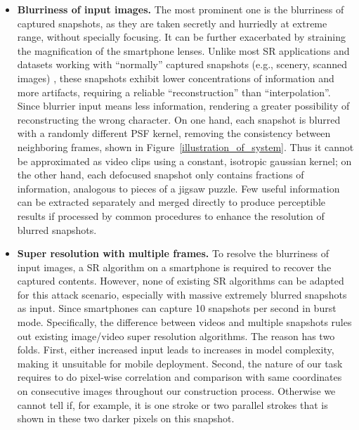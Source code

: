 \begin{itemize}[leftmargin=*]
  \item \textbf{Blurriness of input images.} The most prominent one is the blurriness of captured snapshots, as they are taken secretly and hurriedly at extreme range, without specially focusing. It can be further exacerbated by straining the magnification of the smartphone lenses. Unlike most SR applications and datasets working with ``normally'' captured snapshots (e.g., scenery, scanned images) \cite{nasrollahi2020deep,lyn2020image}, these snapshots exhibit lower concentrations of information and more artifacts, requiring a reliable ``reconstruction'' than ``interpolation''. Since blurrier input means less information, rendering a greater possibility of reconstructing the wrong character. 
  On one hand, each snapshot is blurred with a randomly different PSF kernel, removing the consistency between neighboring frames, shown in Figure~\ref{illustration_of_system}. Thus it cannot be approximated as video clips using a constant, isotropic gaussian kernel; on the other hand, each defocused snapshot only contains fractions of information, analogous to pieces of a jigsaw puzzle.
  Few useful information can be extracted separately and merged directly to produce perceptible results if processed by common procedures to enhance the resolution of blurred snapshots. 
  \item \textbf{Super resolution with multiple frames.} To resolve the blurriness of input images, a SR algorithm on a smartphone is required to recover the captured contents. However, none of existing SR algorithms can be adapted for this attack scenario, especially with massive extremely blurred snapshots as input. Since smartphones can capture 10 snapshots per second in burst mode. Specifically, the difference between videos and multiple snapshots rules out existing image/video super resolution algorithms. The reason has two folds. First, either increased input leads to increases in model complexity, making it unsuitable for mobile deployment. Second, the nature of our task requires to do pixel-wise correlation and comparison with same coordinates on consecutive images throughout our construction process. Otherwise we cannot tell if, for example, it is one stroke or two parallel strokes that is shown in these two darker pixels on this snapshot.

\end{itemize}
